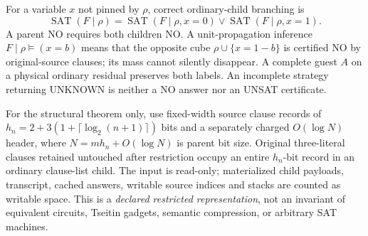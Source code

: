 \documentclass[11pt]{article}
\newcommand{\SAT}{\operatorname{SAT}}
\begin{document}
For a variable $x$ not pinned by $\rho$, correct ordinary-child branching is
\[
 \SAT(F\mid\rho)
 =\SAT(F\mid\rho,x=0)\lor\SAT(F\mid\rho,x=1). \tag{1}
\]
A parent NO requires both children NO. A unit-propagation inference $F\mid\rho\models
(x=b)$ means that the opposite cube $\rho\cup\{x=1-b\}$ is certified NO by
original-source clauses; its mass cannot silently disappear. A complete guest
$A$ on a physical ordinary residual preserves both labels. An incomplete
strategy returning UNKNOWN is neither a NO answer nor an UNSAT certificate.

For the structural theorem only, use fixed-width source clause records of
$h_n=2+3(1+\lceil\log_2(n+1)\rceil)$ bits and a separately charged
$O(\log N)$ header, where $N=m h_n+O(\log N)$ is parent bit size. Original
three-literal clauses retained untouched after restriction occupy an entire
$h_n$-bit record in an ordinary clause-list child. The input is read-only;
materialized child payloads, transcript, cached answers, writable source
indices and stacks are counted as writable space. This is a \emph{declared
restricted representation}, not an invariant of equivalent circuits,
Tseitin gadgets, semantic compression, or arbitrary SAT machines.
\end{document}
